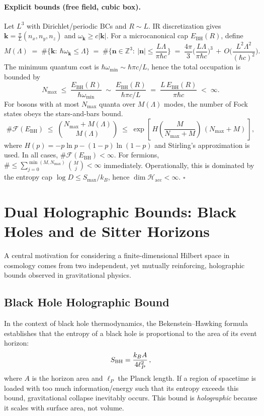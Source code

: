 \documentclass[12pt]{article}
\newcommand{\Smax}{S_{\max}}
\theoremstyle{remark}
\begin{document}
\paragraph{Explicit bounds (free field, cubic box).}
Let $L^3$ with Dirichlet/periodic BCs and $R\sim L$. IR discretization gives 
$\mathbf{k}=\frac{\pi}{L}(n_x,n_y,n_z)$ and $\omega_{\mathbf{k}}\ge c|\mathbf{k}|$.
For a microcanonical cap $E_{\mathrm{BH}}(R)$, define 
\[
M(\Lambda)\;=\;\#\{\mathbf{k}:\ \hbar\omega_{\mathbf{k}}\le \Lambda\}
\;=\;\#\Big\{\mathbf{n}\in\mathbb{Z}^3:\ |\mathbf{n}|\le \frac{L\Lambda}{\pi\hbar c}\Big\}
\;=\;\frac{4\pi}{3}\Big(\frac{L\Lambda}{\pi\hbar c}\Big)^3 \,+\,O\Big(\frac{L^2\Lambda^2}{(\hbar c)^2}\Big).
\]
The minimum quantum cost is $\hbar\omega_{\min}\sim \hbar\pi c/L$, hence the total occupation is bounded by
\[
N_{\max}\;\le\;\frac{E_{\mathrm{BH}}(R)}{\hbar\omega_{\min}}
\;\sim\;\frac{E_{\mathrm{BH}}(R)}{\hbar\pi c/L}
\;=\;\frac{L\,E_{\mathrm{BH}}(R)}{\pi\hbar c}\;<\;\infty.
\]
For bosons with at most $N_{\max}$ quanta over $M(\Lambda)$ modes, the number of Fock states obeys the stars-and-bars bound.
\[
\#\mathcal{F}(E_{\mathrm{BH}})\;\le\;\binom{N_{\max}+M(\Lambda)}{M(\Lambda)}
\;\le\;\exp\!\left[\,H\!\left(\frac{M}{N_{\max}+M}\right)\,(N_{\max}+M)\,\right],
\]
where $H(p)=-p\ln p-(1-p)\ln(1-p)$ and Stirling's approximation is used. In all cases, $\#\mathcal{F}(E_{\mathrm{BH}})<\infty$.
For fermions, $\#\le \sum_{j=0}^{\min(M,N_{\max})}\binom{M}{j}<\infty$ immediately.
Operationally, this is dominated by the entropy cap $\log D\le \Smax/k_B$, hence $\dim\mathcal{H}_{\mathrm{acc}}<\infty$.
\hfill$\square$



\section{Dual Holographic Bounds: Black Holes and de Sitter Horizons}
A central motivation for considering a finite-dimensional Hilbert space in cosmology comes from two independent,
yet mutually reinforcing, holographic bounds observed in gravitational physics.

\subsection{Black Hole Holographic Bound}
In the context of black hole thermodynamics, the Bekenstein--Hawking formula establishes that the entropy of a black hole is proportional to the area of its event horizon:
\begin{equation}
S_{\rm BH} = \frac{k_B A}{4 \ell_P^2} \, ,
\end{equation}
where $A$ is the horizon area and $\ell_P$ the Planck length.
If a region of spacetime is loaded with too much information/energy such that its entropy exceeds this bound, gravitational collapse inevitably occurs.
This bound is \emph{holographic} because it scales with surface area, not volume.
\end{document}
